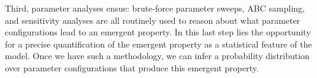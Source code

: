 \documentclass[11pt]{article}
\begin{document}
Third, parameter analyses ensue: brute-force parameter sweeps, ABC sampling, and sensitivity analyses are all routinely used to reason about what parameter configurations lead to an emergent property.
In this last step lies the opportunity for a precise quantification of the emergent property as a statistical feature of the model.
Once we have such a methodology, we can infer a probability distribution over parameter configurations that produce this emergent property.
\end{document}
